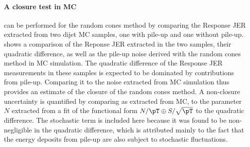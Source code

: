









\paragraph{A closure test in MC} can be performed for the random cones method by comparing the Response JER extracted from two dijet MC samples, one with pile-up and one without pile-up.  shows a comparison of the Reponse JER extracted in the two samples, their quadratic difference, as well as the pile-up noise derived with the random cones method in MC simulation. 
The quadratic difference of the Response JER measurements in these samples is expected to be dominated by contributions from pile-up.
Comparing it to the noise extracted from MC simulation thus provides an estimate of the closure of the random cones method.
A non-closure uncertainty is quantified by comparing \Npileup as extracted from MC, to the parameter $N$ extracted from a fit of the functional form $N/\pT \oplus S/\sqrt{\pT}$ to the quadratic difference. The stochastic term is included here because it was found to be non-negligible in the quadratic difference, which is attributed mainly to the fact that the energy deposits from pile-up are also subject to stochastic fluctuations.

